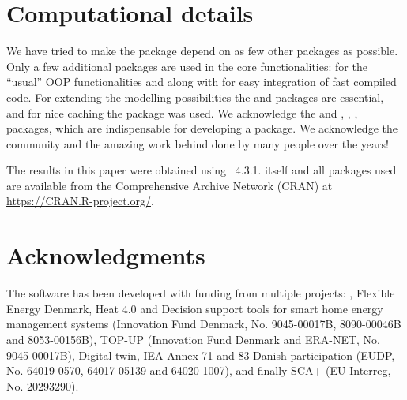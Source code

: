 \section*{Computational details}
We have tried to make the \onlineforecast package depend on as few other
packages as possible. Only a few additional packages are used in the core
functionalities:  for the ``usual'' OOP functionalities and  \citep{eddelbuettel2018}
along with  \citep{eddelbuettel2014} for easy integration of fast compiled code. For
extending the modelling possibilities the  and  packages
are essential, and for nice caching the  package was used. We acknowledge the
 and  \citep{Yihui2015},  \citep{Yihui2018},
,  \citep{Wickham2011}
packages, which are indispensable for developing a package. We acknowledge
the \Rprog community and the amazing work behind \Rprog done by many people over the
years!

The results in this paper were obtained using \Rprog~4.3.1. \Rprog itself and all packages used are available from the
Comprehensive \Rprog Archive Network (CRAN) at \url{https://CRAN.R-project.org/}.


\section*{Acknowledgments}

The software has been developed with funding from multiple projects:
, Flexible
Energy Denmark, Heat 4.0 and Decision support tools for smart home energy
management systems (Innovation Fund Denmark, No. 9045-00017B, 8090-00046B and
8053-00156B), TOP-UP (Innovation Fund Denmark and ERA-NET, No. 9045-00017B),
Digital-twin, IEA Annex 71 and 83 Danish participation (EUDP, No. 64019-0570,
64017-05139 and 64020-1007), and finally SCA+ (EU Interreg, No. 20293290).






\newpage

